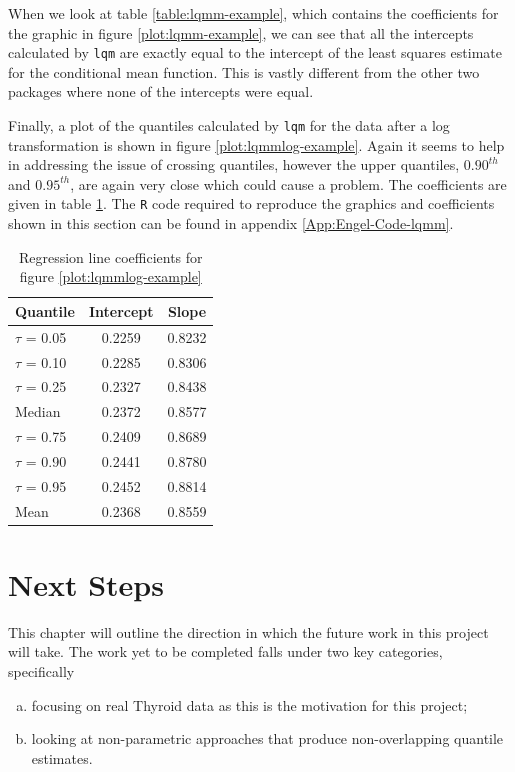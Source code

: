 \documentclass[12pt,a4paper]{report}
\begin{document}
When we look at table \ref{table:lqmm-example}, which contains the coefficients for the graphic in figure \ref{plot:lqmm-example}, we can see that all the intercepts calculated by {\small\verb"lqm"} are exactly equal to the intercept of the least squares estimate for the conditional mean function. This is vastly different from the other two packages where none of the intercepts were equal.
\vspace{2mm}

Finally, a plot of the quantiles calculated by {\small\verb"lqm"} for the data after a log transformation is shown in figure \ref{plot:lqmmlog-example}. Again it seems to help in addressing the issue of crossing quantiles, however the upper quantiles, $0.90^{th}$ and $0.95^{th}$, are again very close which could cause a problem. The coefficients are given in table \ref{table:lqmmlog-example}. The {\small\verb"R"} code required to reproduce the graphics and coefficients shown in this section can be found in appendix \ref{App:Engel-Code-lqmm}.

\begin{table}[ht]
\begin{center}
\begin{tabular}{|l||c|c|} \hline
\multicolumn{1}{|l||}{Quantile}&\multicolumn{1}{c|}{Intercept}&\multicolumn{1}{c|}{Slope}\tabularnewline
\hline
$\tau$ = 0.05&0.2259&0.8232\tabularnewline
$\tau$ = 0.10&0.2285&0.8306\tabularnewline
$\tau$ = 0.25&0.2327&0.8438\tabularnewline
Median&0.2372&0.8577\tabularnewline
$\tau$ = 0.75&0.2409&0.8689\tabularnewline
$\tau$ = 0.90&0.2441&0.8780\tabularnewline
$\tau$ = 0.95&0.2452&0.8814\tabularnewline
Mean&0.2368&0.8559\tabularnewline
\hline
\end{tabular}
\end{center}
\caption{Regression line coefficients for figure \ref{plot:lqmmlog-example}}
\label{table:lqmmlog-example}
\end{table}

\chapter{Next Steps}
This chapter will outline the direction in which the future work in this project will take. The work yet to be completed falls under two key categories, specifically
\begin{enumerate}[(a)]
    \item focusing on real Thyroid data as this is the motivation for this project;
    \item looking at non-parametric approaches that produce non-overlapping quantile estimates.
\end{enumerate}
\end{document}
